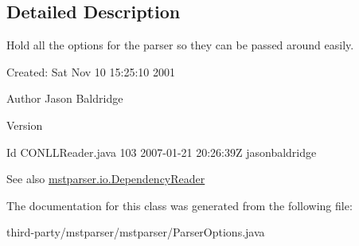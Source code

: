 \subsection{Detailed Description}
Hold all the options for the parser so they can be passed around easily.

Created: Sat Nov 10 15:25:10 2001 

\begin{DoxyAuthor}{Author}
Jason Baldridge 
\end{DoxyAuthor}
\begin{DoxyVersion}{Version}

\end{DoxyVersion}
\begin{DoxyParagraph}{Id}
CONLLReader.java 103 2007-\/01-\/21 20:26:39Z jasonbaldridge 
\end{DoxyParagraph}
\begin{DoxySeeAlso}{See also}
\hyperlink{classmstparser_1_1io_1_1DependencyReader}{mstparser.io.DependencyReader} 
\end{DoxySeeAlso}


The documentation for this class was generated from the following file:\begin{DoxyCompactItemize}
\item 
third-\/party/mstparser/mstparser/ParserOptions.java\end{DoxyCompactItemize}
